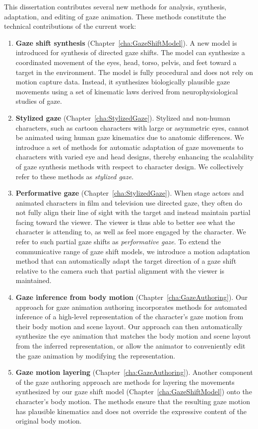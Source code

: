 This dissertation contributes several new methods for analysis, synthesis, adaptation, and editing of gaze animation. These methods constitute the technical contributions of the current work:

\begin{enumerate}
\item \textbf{Gaze shift synthesis} (Chapter~\ref{cha:GazeShiftModel}). A new model is introduced for synthesis of directed gaze shifts. The model can synthesize a coordinated movement of the eyes, head, torso, pelvis, and feet toward a target in the environment. The model is fully procedural and does not rely on motion capture data. Instead, it synthesizes biologically plausible gaze movements using a set of kinematic laws derived from neurophysiological studies of gaze.
\item \textbf{Stylized gaze} (Chapter~\ref{cha:StylizedGaze}). Stylized and non-human characters, such as cartoon characters with large or asymmetric eyes, cannot be animated using human gaze kinematics due to anatomic differences. We introduce a set of methods for automatic adaptation of gaze movements to characters with varied eye and head designs, thereby enhancing the scalability of gaze synthesis methods with respect to character design. We collectively refer to these methods as \emph{stylized gaze}.
\item \textbf{Performative gaze} (Chapter~\ref{cha:StylizedGaze}). When stage actors and animated characters in film and television use directed gaze, they often do not fully align their line of sight with the target and instead maintain partial facing toward the viewer. The viewer is thus able to better see what the character is attending to, as well as feel more engaged by the character. We refer to such partial gaze shifts as \emph{performative gaze}. To extend the communicative range of gaze shift models, we introduce a motion adaptation method that can automatically adapt the target direction of a gaze shift relative to the camera such that partial alignment with the viewer is maintained.
\item \textbf{Gaze inference from body motion} (Chapter~\ref{cha:GazeAuthoring}). Our approach for gaze animation authoring incorporates methods for automated inference of a high-level representation of the character's gaze motion from their body motion and scene layout. Our approach can then automatically synthesize the eye animation that matches the body motion and scene layout from the inferred representation, or allow the animator to conveniently edit the gaze animation by modifying the representation.
\item \textbf{Gaze motion layering} (Chapter~\ref{cha:GazeAuthoring}). Another component of the gaze authoring approach are methods for layering the movements synthesized by our gaze shift model (Chapter~\ref{cha:GazeShiftModel}) onto the character's body motion. The methods ensure that the resulting gaze motion has plausible kinematics and does not override the expressive content of the original body motion.
\end{enumerate}

